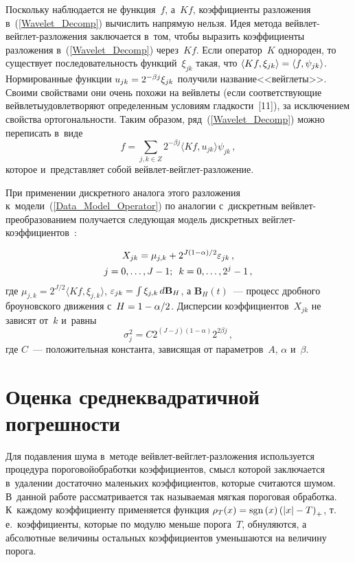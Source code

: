\begin{multicols}{2}
Поскольку наблюдается не функция~$f$, а~$Kf$, коэффициенты разложения 
в~(\ref{Wavelet_Decomp}) вычислить
напрямую нельзя. Идея метода вейв\-лет-вейг\-лет-раз\-ло\-же\-ния 
заключается в~том, чтобы выразить коэффициенты разложения в~(\ref{Wavelet_Decomp}) 
через~$Kf$. Если \mbox{оператор}~$K$ однороден, то существует последовательность
 функций~$\xi_{jk}$ такая, что $\langle Kf, \xi_{jk}\rangle \hm= \langle f, 
 \psi_{jk}\rangle$. Нормированные функции $u_{jk}\hm=2^{-\beta j}\xi_{jk}$ 
 получили название\linebreak <<вейглеты>>. Своими свойствами они очень похо\-жи на вейвлеты 
 (если соответствующие вейвлеты\linebreak удовлетворяют определенным условиям глад\-кости~[11]), 
 за исключением свойства ортогональности. Таким образом, ряд~(\ref{Wavelet_Decomp}) 
 можно переписать в~виде
\begin{equation*}
f=\sum\limits_{j,k\in Z}2^{-\beta j}\langle Kf, u_{jk}\rangle\psi_{jk}\,,
\end{equation*}
которое и~представляет собой вейв\-лет-вейг\-лет-разложение.

При применении дискретного аналога этого разложения 
к~модели~(\ref{Data_Model_Operator}) по аналогии с~дискретным вейв\-лет-пре\-обра\-зо\-ва\-ни\-ем 
получается следующая модель дискретных вейг\-лет-ко\-эф\-фи\-ци\-ен\-тов~\cite{9-sh1}:

\columnbreak 

\noindent
\begin{multline*}
X_{jk} = \mu_{j,k} + 2^{J(1-\alpha)/2} 
\varepsilon_{jk}\,, \\
j=0,\ldots,J-1;\enskip k=0,\ldots,2^j-1\,,
\end{multline*}
где $\mu_{j,k} = 2^{J/2}\langle Kf, \xi_{j,k}\rangle$, 
$\eps_{jk} \hm= \int \xi_{j,k}\, d \mathbf{B}_H$, а $\mathbf{B}_H(t)$~--- 
процесс дробного броуновского движения с~$H \hm= 1-\alpha/2$.
Дисперсии коэффициентов~$X_{jk}$ не зависят от~$k$ и~равны~\cite{10-sh1}
$$
\sigma^2_{j} = C 2^{(J - j)(1 - \alpha)} 2^{2\beta j}\,,
$$
где $C$~--- положительная константа, зависящая от параметров~$A$, $\alpha$ и~$\beta$.

\section{Оценка среднеквадратичной погрешности}

Для подавления шума в~методе вейв\-лет-вейг\-лет-раз\-ло\-же\-ния 
используется процедура пороговой\linebreak обработ\-ки коэффициентов, смысл которой
 заклю\-чается 
в~удалении достаточно маленьких коэффициентов, которые считаются шумом. 
В~данной работе рассматривается так называемая мягкая пороговая обработка. 
К~каждому ко\-эф\-фи\-ци\-ен\-ту применяется функция $\rho_{T}(x)\hm=
\textrm{sgn}\,(x)\left(\abs{x}-T\right)_{+}$, т.\,е.\ 
коэффициенты, которые по модулю меньше порога~$T$, 
обнуляются, а абсолютные величины остальных коэффициентов уменьшаются на 
величину порога.


\end{multicols}
